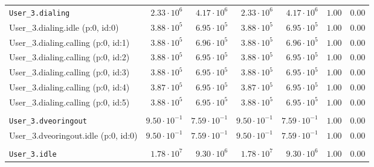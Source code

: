 \begin{table}[htbp]
{\begin{tabular}{lrrrrrr}
\\[-8pt]\texttt{User\_3.dialing}                      &  $2.33 \cdot 10^{6}$ &  $4.17 \cdot 10^{6}$ &  $2.33 \cdot 10^{6}$ &  $4.17 \cdot 10^{6}$ &               $1.00$ &               $0.00$ \\
\hspace{3mm}User\_3.dialing.idle (p:0, id:0)          &  $3.88 \cdot 10^{5}$ &  $6.95 \cdot 10^{5}$ &  $3.88 \cdot 10^{5}$ &  $6.95 \cdot 10^{5}$ &               $1.00$ &               $0.00$ \\
\hspace{3mm}User\_3.dialing.calling (p:0, id:1)       &  $3.88 \cdot 10^{5}$ &  $6.96 \cdot 10^{5}$ &  $3.88 \cdot 10^{5}$ &  $6.96 \cdot 10^{5}$ &               $1.00$ &               $0.00$ \\
\hspace{3mm}User\_3.dialing.calling (p:0, id:2)       &  $3.88 \cdot 10^{5}$ &  $6.95 \cdot 10^{5}$ &  $3.88 \cdot 10^{5}$ &  $6.95 \cdot 10^{5}$ &               $1.00$ &               $0.00$ \\
\hspace{3mm}User\_3.dialing.calling (p:0, id:3)       &  $3.88 \cdot 10^{5}$ &  $6.95 \cdot 10^{5}$ &  $3.88 \cdot 10^{5}$ &  $6.95 \cdot 10^{5}$ &               $1.00$ &               $0.00$ \\
\hspace{3mm}User\_3.dialing.calling (p:0, id:4)       &  $3.87 \cdot 10^{5}$ &  $6.95 \cdot 10^{5}$ &  $3.87 \cdot 10^{5}$ &  $6.95 \cdot 10^{5}$ &               $1.00$ &               $0.00$ \\
\hspace{3mm}User\_3.dialing.calling (p:0, id:5)       &  $3.88 \cdot 10^{5}$ &  $6.95 \cdot 10^{5}$ &  $3.88 \cdot 10^{5}$ &  $6.95 \cdot 10^{5}$ &               $1.00$ &               $0.00$ \\
\\[-8pt]\texttt{User\_3.dveoringout}                  & $9.50 \cdot 10^{-1}$ & $7.59 \cdot 10^{-1}$ & $9.50 \cdot 10^{-1}$ & $7.59 \cdot 10^{-1}$ &               $1.00$ &               $0.00$ \\
\hspace{3mm}User\_3.dveoringout.idle (p:0, id:0)      & $9.50 \cdot 10^{-1}$ & $7.59 \cdot 10^{-1}$ & $9.50 \cdot 10^{-1}$ & $7.59 \cdot 10^{-1}$ &               $1.00$ &               $0.00$ \\
\\[-8pt]\texttt{User\_3.idle}                         &  $1.78 \cdot 10^{7}$ &  $9.30 \cdot 10^{6}$ &  $1.78 \cdot 10^{7}$ &  $9.30 \cdot 10^{6}$ &               $1.00$ &               $0.00$ \\

\end{tabular}}
\end{table}
